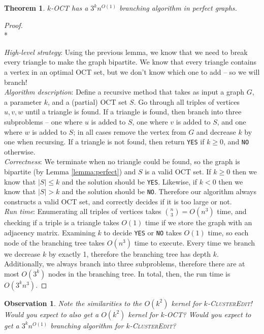 \documentclass{article}
\newcommand{\problem}[1]{\textsc{#1}}
\newtheorem{theorem}{Theorem}
\newtheorem*{observation}{Observation}
\newcommand{\proofnewline}{\mbox{}\\*}
\begin{document}
\begin{theorem}
\problem{$k$-OCT} has a $3^k n^{O(1)}$ branching algorithm in perfect graphs.
\end{theorem}
\begin{proof}
\proofnewline

\noindent \emph{High-level strategy}: Using the previous lemma, we know that we need to break every triangle to make the graph bipartite. We know that every triangle contains a vertex in an optimal OCT set, but we don't know which one to add -- so we will branch!\\

\noindent \emph{Algorithm description}: Define a recursive method that takes as input a graph $G$, a parameter $k$, and a (partial) OCT set $S$. Go through all triples of vertices $u, v, w$ until a triangle is found. If a triangle is found, then branch into three subproblems -- one where $u$ is added to $S$, one where $v$ is added to $S$, and one where $w$ is added to $S$; in all cases remove the vertex from $G$ and decrease $k$ by one when recursing. If a triangle is not found, then return \texttt{YES} if $k \geq 0$, and \texttt{NO} otherwise.\\

\noindent \emph{Correctness}: We terminate when no triangle could be found, so the graph is bipartite (by Lemma \ref{lemma:perfect}) and $S$ is a valid OCT set. If $k \geq 0$ then we know that $|S| \leq k$ and the solution should be \texttt{YES}. Likewise, if $k < 0$ then we know that $|S| > k$ and the solution should be \texttt{NO}. Therefore our algorithm always constructs a valid OCT set, and correctly decides if it is too large or not.\\

\noindent \emph{Run time}: Enumerating all triples of vertices takes $\binom{n}{3} = O(n^3)$ time, and checking if a triple is a triangle takes $O(1)$ time if we store the graph with an adjacency matrix. Examining $k$ to decide \texttt{YES} or \texttt{NO} takes $O(1)$ time, so each node of the branching tree takes $O(n^3)$ time to execute. Every time we branch we decrease $k$ by exactly 1, therefore the branching tree has depth $k$. Additionally, we always branch into three subproblems, therefore there are at most $O(3^k)$ nodes in the branching tree. In total, then, the run time is $O(3^kn^3)$.
\end{proof}

\begin{observation}
Note the similarities to the $O(k^2)$ kernel for \problem{$k$-ClusterEdit}! Would you expect to also get a $O(k^2)$ kernel for \problem{$k$-OCT}? Would you expect to get a $3^k n^{O(1)}$ branching algorithm for \problem{$k$-ClusterEdit}?
\end{observation}
\end{document}
